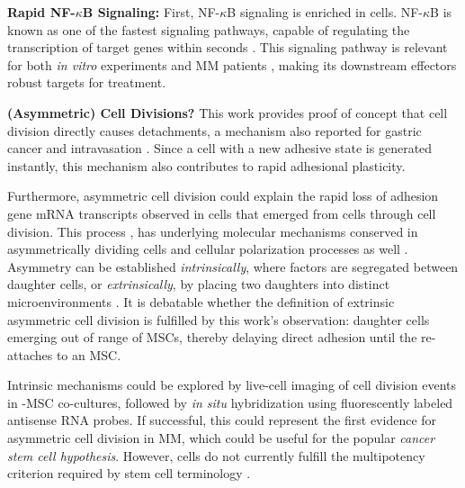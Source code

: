 \textbf{Rapid NF-$\kappa$B Signaling:}
First, NF-$\kappa$B signaling is enriched in \MAina cells.
NF-$\kappa$B is known as one of the fastest signaling pathways, capable of
regulating the transcription of target genes within seconds
\cite{gallego-sellesFastRegulationNFkB2022,
      zarnegarNoncanonicalNFkBActivation2008}. This signaling pathway is relevant for
both \textit{in vitro} experiments and MM patients
\cite{sarinEvaluatingEfficacyMultiple2020}, making its downstream effectors
robust targets for treatment.

\textbf{(Asymmetric) Cell Divisions?}
This work provides proof of concept that cell division directly causes
detachments, a mechanism also reported for gastric cancer and intravasation
\cite{monsterCellDivisiondependentDissemination2024,
wongMitosismediatedIntravasationTissueengineered2017}. Since a cell with a new
adhesive state is generated instantly, this mechanism also contributes to rapid
adhesional plasticity. 

Furthermore, asymmetric cell division could explain the
rapid loss of adhesion gene mRNA transcripts observed in \nMAina cells that
emerged from \MAina cells through cell division. This process
, has underlying molecular mechanisms
conserved in asymmetrically dividing cells and cellular polarization processes
as well \cite{inabaAsymmetricStemCell2012, stjohnstonCellPolarityEggs2010}.
Asymmetry can be established \emph{intrinsically}, where factors are segregated
between daughter cells, or \emph{extrinsically}, by placing two daughters into
distinct microenvironments \cite{inabaAsymmetricStemCell2012}. It is debatable
whether the definition of extrinsic asymmetric cell division is fulfilled by
this work's observation: \nMAina daughter cells emerging out of range of
\acp{MSC}, thereby delaying direct adhesion until the \nMAina re-attaches to an
\ac{MSC}.

Intrinsic mechanisms could be explored by live-cell imaging of cell division
events in \INA-\ac{MSC} co-cultures, followed by \textit{in situ} hybridization
using fluorescently labeled antisense RNA probes. If successful, this could
represent the first evidence for asymmetric cell division in MM, which could be
useful for the popular \emph{cancer stem cell hypothesis}. However, \MAina cells
do not currently fulfill the multipotency criterion required by stem cell
terminology \cite{johnsenMyelomaStemCell2016, liAsymmetricCellDivision2022}.

